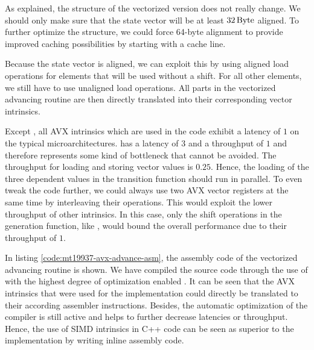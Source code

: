 \documentclass{stdlocal}
\begin{document}
    As explained, the structure of the vectorized version does not really change.
    We should only make sure that the state vector will be at least $32\, \mathrm{Byte}$ aligned.
    To further optimize the structure, we could force 64-byte alignment to provide improved caching possibilities by starting with a cache line.

    Because the state vector is aligned, we can exploit this by using aligned load operations for elements that will be used without a shift.
    For all other elements, we still have to use unaligned load operations.
    All parts in the vectorized advancing routine are then directly translated into their corresponding vector intrinsics.

    Except , all AVX intrinsics which are used in the code exhibit a latency of $1$ on the typical microarchitectures.
     has a latency of $3$ and a throughput of $1$ and therefore represents some kind of bottleneck that cannot be avoided.
    The throughput for loading and storing vector values is $0.25$.
    Hence, the loading of the three dependent values in the transition function should run in parallel.
    To even tweak the code further, we could always use two AVX vector registers at the same time by interleaving their operations.
    This would exploit the lower throughput of other intrinsics.
    In this case, only the shift operations in the generation function, like , would bound the overall performance due to their throughput of $1$.
    \autocite{intel-intrinsics-guide,fog2019d}

    In listing \ref{code:mt19937-avx-advance-asm}, the assembly code of the vectorized advancing routine is shown.
    We have compiled the source code through the use of  with the highest degree of optimization enabled \autocite{compiler-explorer}.
    It can be seen that the AVX intrinsics that were used for the implementation could directly be translated to their according assembler instructions.
    Besides, the automatic optimization of the compiler is still active and helps to further decrease latencies or throughput.
    Hence, the use of SIMD intrinsics in C++ code can be seen as superior to the implementation by writing inline assembly code.
\end{document}
